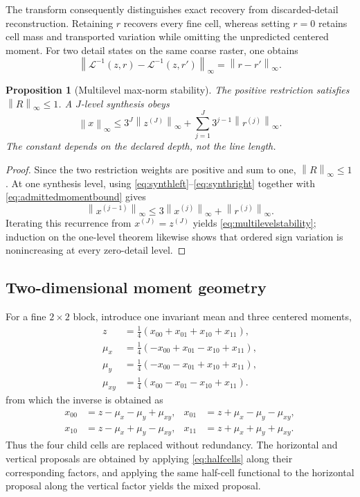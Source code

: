 \documentclass[journal]{IEEEtran}
\newtheorem{proposition}{Proposition}
\newcommand{\norm}[1]{\left\lVert#1\right\rVert}
\begin{document}
The transform consequently distinguishes exact recovery from
discarded-detail reconstruction. Retaining \(r\) recovers every fine cell,
whereas setting \(r=0\) retains cell mass and transported variation while
omitting the unpredicted centered moment. For two detail states on the same
coarse raster, one obtains
\begin{equation}
 \norm{\mathcal L^{-1}(z,r)-\mathcal L^{-1}(z,r')}_\infty
 =\norm{r-r'}_\infty.
 \label{eq:detailstability}
\end{equation}

\begin{proposition}[Multilevel max-norm stability]
The positive restriction satisfies \(\norm R_\infty\leq1\). A \(J\)-level
synthesis obeys
\begin{equation}
 \norm x_\infty\leq3^J\norm{z^{(J)}}_\infty
 +\sum_{j=1}^{J}3^{j-1}\norm{r^{(j)}}_\infty.
 \label{eq:multilevelstability}
\end{equation}
The constant depends on the declared depth, not the line length.
\end{proposition}

\begin{proof}
Since the two restriction weights are positive and sum to one,
\(\norm R_\infty\leq1\). At one synthesis level, using
\eqref{eq:synthleft}--\eqref{eq:synthright} together with
\eqref{eq:admittedmomentbound} gives
\[
 \norm{x^{(j-1)}}_\infty
 \leq3\norm{x^{(j)}}_\infty+\norm{r^{(j)}}_\infty.
\]
Iterating this recurrence from \(x^{(J)}=z^{(J)}\) yields
\eqref{eq:multilevelstability}; induction on the one-level theorem likewise
shows that ordered sign variation is nonincreasing at every zero-detail
level.
\end{proof}

\subsection{Two-dimensional moment geometry}

For a fine \(2\times2\) block, introduce one invariant mean and three
centered moments,
\begin{align}
 z&=\tfrac14(x_{00}+x_{01}+x_{10}+x_{11}),\nonumber\\
 \mu_x&=\tfrac14(-x_{00}+x_{01}-x_{10}+x_{11}),\nonumber\\
 \mu_y&=\tfrac14(-x_{00}-x_{01}+x_{10}+x_{11}),\nonumber\\
 \mu_{xy}&=\tfrac14(x_{00}-x_{01}-x_{10}+x_{11}).
 \label{eq:blockmoments}
\end{align}
from which the inverse is obtained as
\begin{align}
 x_{00}&=z-\mu_x-\mu_y+\mu_{xy},&
 x_{01}&=z+\mu_x-\mu_y-\mu_{xy},\nonumber\\
 x_{10}&=z-\mu_x+\mu_y-\mu_{xy},&
 x_{11}&=z+\mu_x+\mu_y+\mu_{xy}.
 \label{eq:blockinverse}
\end{align}
Thus the four child cells are replaced without redundancy. The horizontal
and vertical proposals are obtained by applying \eqref{eq:halfcells} along
their corresponding factors, and applying the same half-cell functional to
the horizontal proposal along the vertical factor yields the mixed proposal.
\end{document}

